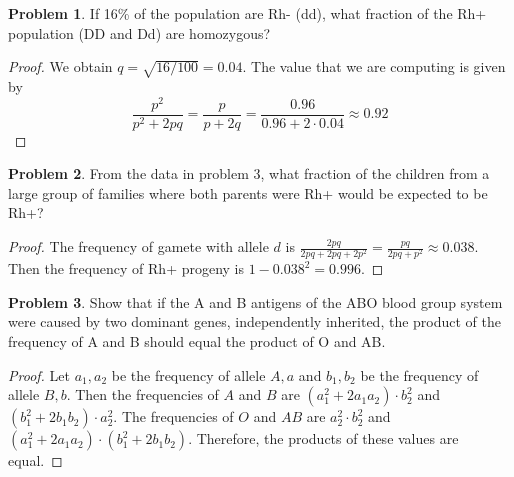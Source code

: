 \documentclass[12pt]{report}
\theoremstyle{definition}
\newtheorem{problem}{Problem}[chapter]
\begin{document}
        \begin{problem}
            If 16\% of the population are Rh- (dd), what fraction of the Rh+ population (DD and Dd) are homozygous?
            \begin{proof}
                We obtain $q = \sqrt{16/100} = 0.04$. 
                The value that we are computing is given by
                \begin{equation*}
                    \frac{p^2}{p^2+2pq} 
                    = \frac{p}{p+2q} 
                    = \frac{0.96}{0.96+2 \cdot 0.04}
                    \approx 0.92
                \end{equation*}
            \end{proof}
        \end{problem}

        \begin{problem}
            From the data in problem 3, what fraction of the children from a large group of families where both parents were Rh+ would be expected to be Rh+?
            \begin{proof}
                The frequency of gamete with allele $d$ is $\frac{2pq}{2pq+2pq+2p^2} = \frac{pq}{2pq+p^2} \approx 0.038$. 
                Then the frequency of Rh+ progeny is $1-0.038^2 = 0.996$.
            \end{proof}
        \end{problem}

        \begin{problem}
            Show that if the A and B antigens of the ABO blood group system were caused by two dominant genes, independently inherited, the product of the frequency of A and B should equal the product of O and AB.
            \begin{proof}
                Let $a_1, a_2$ be the frequency of allele $A, a$ and $b_1, b_2$ be the frequency of allele $B, b$.
                Then the frequencies of $A$ and $B$ are $(a_1^2+2a_1a_2) \cdot b_2^2$ and $(b_1^2+2b_1b_2) \cdot a_2^2$.
                The frequencies of $O$ and $AB$ are $a_2^2 \cdot b_2^2$ and $(a_1^2+2a_1a_2) \cdot (b_1^2+2b_1b_2)$.
                Therefore, the products of these values are equal.
            \end{proof}
        \end{problem}
\end{document}
